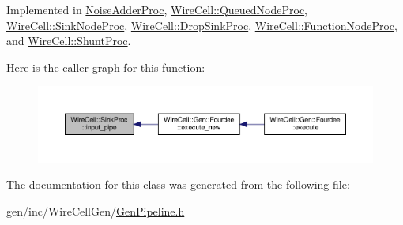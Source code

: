 Implemented in \hyperlink{class_noise_adder_proc_ae665a985d66a87bc63aeefb3333170d2}{Noise\+Adder\+Proc}, \hyperlink{class_wire_cell_1_1_queued_node_proc_a5cbb0b00898b61cbda322e5376ae7608}{Wire\+Cell\+::\+Queued\+Node\+Proc}, \hyperlink{class_wire_cell_1_1_sink_node_proc_a7a663013b7c3dc008f55eac98a683de3}{Wire\+Cell\+::\+Sink\+Node\+Proc}, \hyperlink{class_wire_cell_1_1_drop_sink_proc_ab7cd47b06032c02f22e39a16d9a1aba6}{Wire\+Cell\+::\+Drop\+Sink\+Proc}, \hyperlink{class_wire_cell_1_1_function_node_proc_a848ef80dad2daa18d3c6ff85ab0db9e4}{Wire\+Cell\+::\+Function\+Node\+Proc}, and \hyperlink{class_wire_cell_1_1_shunt_proc_a64f7a4594c007c4ffd3ea12febaffbfa}{Wire\+Cell\+::\+Shunt\+Proc}.

Here is the caller graph for this function\+:
\nopagebreak
\begin{figure}[H]
\begin{center}
\leavevmode
\includegraphics[width=350pt]{class_wire_cell_1_1_sink_proc_a47ec8c790457ad63e9d0bb9b1b7da935_icgraph}
\end{center}
\end{figure}


The documentation for this class was generated from the following file\+:\begin{DoxyCompactItemize}
\item 
gen/inc/\+Wire\+Cell\+Gen/\hyperlink{_gen_pipeline_8h}{Gen\+Pipeline.\+h}\end{DoxyCompactItemize}

